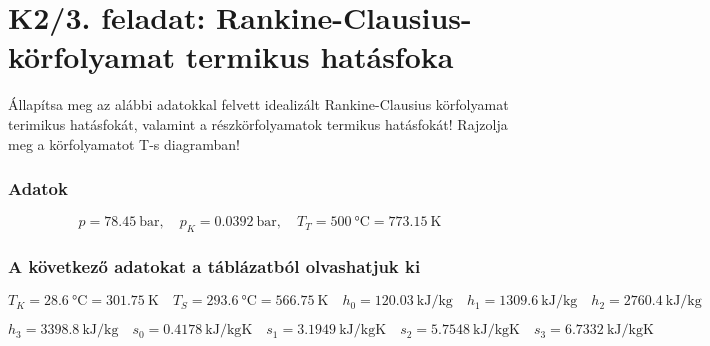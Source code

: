 \section*{K2/3. feladat: Rankine-Clausius-körfolyamat termikus hatásfoka}
Állapítsa meg az alábbi adatokkal felvett idealizált Rankine-Clausius körfolyamat terimikus hatásfokát, valamint a részkörfolyamatok termikus hatásfokát! Rajzolja meg a körfolyamatot T-s diagramban!
\subsubsection{Adatok}
\begin{equation*}
      p=\SI{78.45}{\bar},
      \quad                            
      p_K=\SI{0.0392}{\bar},
      \quad
      T_T=\SI{500}{\celsius}=\SI{773.15}{\kelvin}
\end{equation*}
\subsubsection{A következő adatokat a táblázatból olvashatjuk ki}
\begin{equation*}
	T_K=\SI{28.6}{\celsius}=\SI{301.75}{\kelvin}
	\quad 
	T_S=\SI{293.6}{\celsius}=\SI{566.75}{\kelvin}
	\quad
	h_0=\SI{120.03}{\kilo\joule\per\kilogram}
	\quad
	h_1=\SI{1309.6}{\kilo\joule\per\kilogram}
	\quad
	h_2=\SI{2760.4}{\kilo\joule\per\kilogram}
	\quad
\end{equation*}

\begin{equation*}
	h_3=\SI{3398.8}{\kilo\joule\per\kilogram}
	\quad
	s_0=\SI{0.4178}{\kilo\joule\per\kilogram\kelvin}
	\quad
	s_1=\SI{3.1949}{\kilo\joule\per\kilogram\kelvin}
	\quad
	s_2=\SI{5.7548}{\kilo\joule\per\kilogram\kelvin}
	\quad
	s_3=\SI{6.7332}{\kilo\joule\per\kilogram\kelvin}
\end{equation*}

